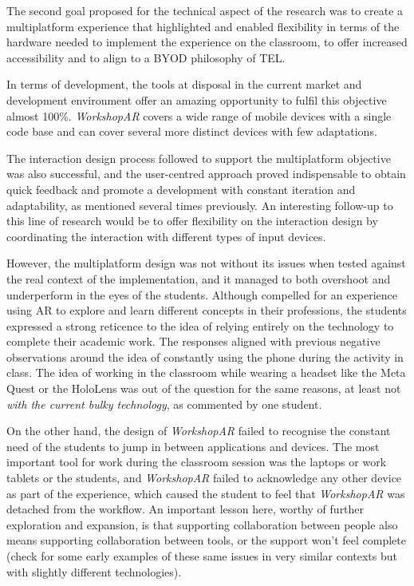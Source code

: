 The second goal proposed for the technical aspect of the research was to create a multiplatform experience that highlighted and enabled flexibility in terms of the hardware needed to
implement the experience on the classroom, to offer increased accessibility and to align to a \acf{BYOD} philosophy of \acf{TEL}.

In terms of development, the tools at disposal in the current market and development environment offer an amazing opportunity to fulfil this objective almost 100\%. \emph{WorkshopAR} covers
a wide range of mobile devices with a single code base and can cover several more distinct devices with few adaptations.

The interaction design process followed to support the multiplatform objective was also successful, and the user-centred approach proved indispensable to obtain quick feedback and promote
a development with constant iteration and adaptability, as mentioned several times previously. An interesting follow-up to this line of research would be to offer flexibility on the
interaction design by coordinating the interaction with different types of input devices.

However, the multiplatform design was not without its issues when tested against the real context of the implementation, and it managed to both overshoot and underperform in the eyes of
the students. Although compelled for an experience using \ac{AR} to explore and learn different concepts in their professions, the students expressed a strong reticence to the idea of
relying entirely on the technology to complete their academic work. The responses aligned with previous negative observations around the idea of constantly using the phone during the
activity in class. The idea of working in the classroom while wearing a headset like the Meta Quest or the HoloLens was out of the question for the same reasons, at least not \emph{with
the current bulky technology}, as commented by one student.

On the other hand, the design of \emph{WorkshopAR} failed to recognise the constant need of the students to jump in between applications and devices. The most important tool for work
during the classroom session was the laptops or work tablets or the students, and \emph{WorkshopAR} failed to acknowledge any other device as part of the experience, which caused the
student to feel that \emph{WorkshopAR} was detached from the workflow. An important lesson here, worthy of further exploration and expansion, is that supporting collaboration between
people also means supporting collaboration between tools, or the support won't feel complete (check \textcite{cole_2003,iglesias_2017} for some early examples of these same issues in very
similar contexts but with slightly different technologies).

